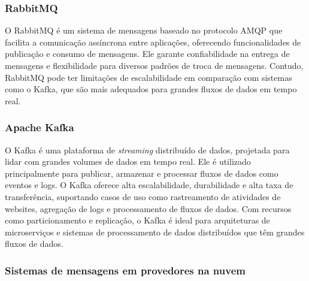 \subsubsection*{RabbitMQ}

O RabbitMQ é um sistema de mensagens baseado no protocolo AMQP que facilita a comunicação assíncrona entre aplicações, oferecendo funcionalidades de publicação e consumo de mensagens. Ele garante confiabilidade na entrega de mensagens e flexibilidade para diversos padrões de troca de mensagens. Contudo, RabbitMQ pode ter limitações de escalabilidade em comparação com sistemas como o Kafka, que são mais adequados para grandes fluxos de dados em tempo real.

\subsubsection*{Apache Kafka}
O Kafka é uma plataforma de \emph{streaming} distribuído de dados, projetada para lidar com grandes volumes de dados em tempo real. Ele é utilizado principalmente para publicar, armazenar e processar fluxos de dados como eventos e logs. O Kafka oferece alta escalabilidade, durabilidade e alta taxa de transferência, suportando casos de uso como rastreamento de atividades de websites, agregação de logs e processamento de fluxos de dados. Com recursos como particionamento e replicação, o Kafka é ideal para arquiteturas de microserviços e sistemas de processamento de dados distribuídos que têm grandes fluxos de dados. \cite{apache-kafka}

\subsubsection{Sistemas de mensagens em provedores na nuvem}

